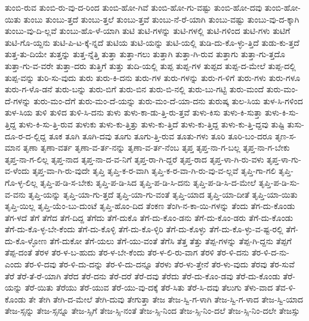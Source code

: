 {ತುಂಬಿ-ರುವ
ತುಂಬಿ-ರು-ವು-ದ-ರಿಂದ
ತುಂಬಿ-ಹೋ-ಗಿವೆ
ತುಂಬಿ-ಹೋ-ಗು-ವಷ್ಟು
ತುಂಬಿ-ಹೋ-ದವು
ತುಂಬಿ-ಹೋ-ಯಿತು
ತುಂಬು
ತುಂಬು-ತ್ತದೆ
ತುಂಬು-ತ್ತಲೆ
ತುಂಬು-ತ್ತವೆ
ತುಂಬು-ನೆ-ರೆ-ಯಾಗಿ
ತುಂಬು-ವಷ್ಟು
ತುಂಬು-ವು-ದ-ಕ್ಕಾಗಿ
ತುಂಬು-ವು-ದಿ-ಲ್ಲವೆ
ತುಂಬು-ಹೊ-ಳೆ-ಯಾಗಿ
ತುಟಿ
ತುಟಿ-ಗಳನ್ನು
ತುಟಿ-ಗಳಲ್ಲಿ
ತುಟಿ-ಗಳಿಂದ
ತುಟಿ-ಗಳು
ತುಟಿಗೆ
ತುಟಿ-ಗೊ-ಯ್ದನು
ತುಟಿ-ಪಿ-ಟ-ಕ್ಕೆ-ನ್ನದೆ
ತುಟಿಯ
ತುಟಿ-ಯನ್ನು
ತುಟಿ-ಯಲ್ಲಿ
ತುಡಿ-ದು-ಕೊ-ಳ್ಳು-ತ್ತಿದೆ
ತುಡು-ಕು-ತ್ತದೆ
ತುತ್ತ-ತು-ದಿಯೇ
ತುತ್ತನ್ನು
ತುತ್ತ-ನ್ನೆತ್ತಿ
ತುತ್ತಾ
ತುತ್ತಾ-ಗಲು
ತುತ್ತಾಗಿ
ತುತ್ತಾ-ಗಿ-ರುವ
ತುತ್ತಾಗು
ತುತ್ತಾ-ಗು-ತ್ತದೊ
ತುತ್ತಾ-ಗು-ವ-ವರೇ
ತುತ್ತಾ-ದರು
ತುತ್ತಿಗೆ
ತುತ್ತು
ತುದಿ-ಯಲ್ಲಿ
ತುಪ್ಪ
ತುಪ್ಪ-ಗಳ
ತುಪ್ಪದ
ತುಪ್ಪ-ದ-ಮೇಲೆ
ತುಪ್ಪ-ದಲ್ಲಿ
ತುಪ್ಪ-ವನ್ನು
ತುರಿ-ಸು-ವುದು
ತುರು
ತುರು-ಕಿ-ದನು
ತುರು-ಗಳ
ತುರು-ಗಳನ್ನು
ತುರು-ಗ-ಳಿಗೆ
ತುರು-ಗಳು
ತುರು-ಗಳೂ
ತುರು-ಗ-ಳೊ-ಡನೆ
ತುರು-ಬನ್ನು
ತುರು-ಬಿಗೆ
ತುರು-ಬಿನ
ತುರು-ಬಿ-ನಲ್ಲಿ
ತುರು-ಬು-ಗಟ್ಟಿ
ತುರು-ಮಂದೆ
ತುರು-ಮಂ-ದೆ-ಗಳನ್ನು
ತುರು-ಮಂ-ದೆಗೆ
ತುರು-ಮಂ-ದೆ-ಯನ್ನು
ತುರು-ಮಂ-ದೆ-ಯಾ-ದನು
ತುರುಷ್ಕ
ತುಲ-ಸಿಯ
ತುಳ-ಸಿ-ಗಳಿಂದ
ತುಳ-ಸಿಯ
ತುಳಿ
ತುಳಿದ
ತುಳಿ-ಸಿ-ದನು
ತುಳು
ತುಳು-ಕಾ-ಡು-ತ್ತಿ-ರು-ತ್ತವೆ
ತುಳು-ಕಿಸು
ತುಳು-ಕಿ-ಸುತ್ತಾ
ತುಳು-ಕಿ-ಸು-ತ್ತಿದ್ದ
ತುಳು-ಕಿ-ಸು-ತ್ತಿ-ರುವ
ತುಳುಕು
ತುಳು-ಕು-ತ್ತಿತ್ತು
ತುಳು-ಕು-ತ್ತಿದೆ
ತುಳು-ಕು-ತ್ತಿದ್ದ
ತುಳು-ಕು-ತ್ತಿ-ದ್ದವು
ತುಷ್ಟಿ
ತುಸು-ದೂ-ರ-ದ-ಲ್ಲಿದ್ದ
ತೂಕ
ತೂಗಿ
ತೂಗಿ-ದವು
ತೂಗು
ತೂಗು-ತ್ತಿ-ರುವ
ತೂತು-ಗಳು
ತೂರಿ
ತೂರಿ-ಬಂ-ದರೂ
ತೃಣ-ಸ-ಮಾನ
ತೃಣಾ
ತೃಣಾ-ವರ್ತ
ತೃಣಾ-ವ-ರ್ತ-ನನ್ನು
ತೃಣಾ-ವ-ರ್ತ-ನೆಂಬ
ತೃಪ್ತ
ತೃಪ್ತ-ನಾ-ಗ-ಬಲ್ಲ
ತೃಪ್ತ-ನಾ-ಗ-ಬೇಕು
ತೃಪ್ತ-ನಾ-ಗ-ಲಿಲ್ಲ
ತೃಪ್ತ-ನಾದ
ತೃಪ್ತ-ನಾ-ದ-ವ-ನಿಗೆ
ತೃಪ್ತ-ರಾ-ಗಿ-ದ್ದರೆ
ತೃಪ್ತ-ರಾದ
ತೃಪ್ತ-ಳಾ-ಗಿ-ರು-ವಳು
ತೃಪ್ತ-ಳಾ-ಗು-ವ-ಳೆಂದು
ತೃಪ್ತ-ವಾ-ಗಿ-ರು-ವುದೇ
ತೃಪ್ತಿ
ತೃಪ್ತಿ-ಕ-ರ-ವಾಗಿ
ತೃಪ್ತಿ-ಕ-ರ-ವಾ-ಗಿ-ರು-ವು-ವ-ಲ್ಲವೆ
ತೃಪ್ತಿ-ಗಾ-ಗಲಿ
ತೃಪ್ತಿ-ಗೊ-ಳ್ಳ-ಲಿಲ್ಲ
ತೃಪ್ತಿ-ಪ-ಡಿ-ಸ-ಬೇಕು
ತೃಪ್ತಿ-ಪ-ಡಿ-ಸಿದ
ತೃಪ್ತಿ-ಪ-ಡಿ-ಸಿ-ದನು
ತೃಪ್ತಿ-ಪ-ಡಿ-ಸಿ-ದ-ಮೇಲೆ
ತೃಪ್ತಿ-ಪ-ಡಿ-ಸು-ವ-ವನು
ತೃಪ್ತಿ-ಯನ್ನು
ತೃಪ್ತಿ-ಯಾ-ಗು-ತ್ತದೆ
ತೃಪ್ತಿ-ಯಾ-ಗು-ವಂತೆ
ತೃಪ್ತಿ-ಯಾದ
ತೃಪ್ತಿ-ಯಾ-ದೀತೆ
ತೃಪ್ತಿ-ಯಾ-ಯಿತು
ತೃಪ್ತಿ-ಯಿಲ್ಲ
ತೃಪ್ತಿ-ಯೆಂ-ಬು-ದುಂಟೆ
ತೃಪ್ತಿ-ಹೊಂ-ದಿದ
ತೆಂಕಣ
ತೆಂಗಿ-ನ-ಕಾ-ಯಿ-ಗಳನ್ನು
ತೆಂದು
ತೆಗ-ದು-ಕೊಂಡು
ತೆಗ-ಳದೆ
ತೆಗೆ
ತೆಗೆದ
ತೆಗೆ-ದಿದ್ದ
ತೆಗೆದು
ತೆಗೆ-ದುಕೊ
ತೆಗೆ-ದು-ಕೊಂ-ಡನು
ತೆಗೆ-ದು-ಕೊಂ-ಡರು
ತೆಗೆ-ದು-ಕೊಂಡು
ತೆಗೆ-ದು-ಕೊ-ಳ್ಳ-ಬೇ-ಕೆಂದು
ತೆಗೆ-ದು-ಕೊಳ್ಳಿ
ತೆಗೆ-ದು-ಕೊ-ಳ್ಳಿರಿ
ತೆಗೆ-ದು-ಕೊಳ್ಳು
ತೆಗೆ-ದು-ಕೊ-ಳ್ಳು-ವ-ಷ್ಟ-ರಲ್ಲಿ
ತೆಗೆ-ದು-ಕೊ-ಳ್ಳೋಣ
ತೆಗೆ-ದುಕೋ
ತೆಗೆ-ಯಲು
ತೆಗೆ-ಯು-ವಂತೆ
ತೆಗೆಸಿ
ತೆತ್ತ
ತೆತ್ತು
ತೆಪ್ಪ-ಗಳನ್ನು
ತೆಪ್ಪ-ಗಿ-ದ್ದನು
ತೆಪ್ಪಗೆ
ತೆಪ್ಪ-ದಂತೆ
ತೆರಳ
ತೆರ-ಳ-ಬ-ಹುದು
ತೆರ-ಳ-ಬೇ-ಕೆಂದು
ತೆರ-ಳ-ಲಿ-ರು-ವಾಗ
ತೆರಳಿ
ತೆರ-ಳಿ-ದನು
ತೆರ-ಳಿ-ದ-ನು-ಎಂದು
ತೆರ-ಳಿ-ದವು
ತೆರ-ಳಿ-ದು-ದನ್ನು
ತೆರ-ಳಿ-ದು-ದನ್ನೂ
ತೆರಳು
ತೆರ-ಳು-ತ್ತೇನೆ
ತೆರ-ಳು-ವುದು
ತೆರವು
ತೆರ-ಸುವೆ
ತೆರೆ
ತೆರೆ-ತೆ-ರೆ-ಯಾಗಿ
ತೆರೆದ
ತೆರೆ-ದನು
ತೆರೆ-ದರೆ
ತೆರೆ-ದವು
ತೆರೆದು
ತೆರೆ-ದು-ಕೊಂ-ಡವು
ತೆರೆ-ದು-ಕೊಂಡು
ತೆರೆ-ಯನ್ನು
ತೆರೆ-ಯಿತು
ತೆರೆಯು
ತೆರೆ-ಯುವ
ತೆರೆ-ಯು-ವು-ದಕ್ಕೆ
ತೆರೆ-ಸಿತು
ತೆರೆ-ಸಿ-ದವು
ತೆಲುಗು
ತೆಳು-ವಾದ
ತೆವ-ಳಿ-ಕೊಂಡು
ತೇ
ತೇಗಿ
ತೇಗಿ-ದ-ಮೇಲೆ
ತೇಗಿ-ದುವು
ತೇಗುತ್ತಾ
ತೇಜ
ತೇಜ-ಸ್ವಿ-ಗ-ಳಾಗಿ
ತೇಜ-ಸ್ವಿ-ಗ-ಳಾದ
ತೇಜ-ಸ್ವಿ-ಯಾದ
ತೇಜ-ಸ್ಸನ್ನು
ತೇಜ-ಸ್ಸನ್ನೂ
ತೇಜ-ಸ್ಸಿಗೆ
ತೇಜ-ಸ್ಸಿ-ನಂತೆ
ತೇಜ-ಸ್ಸಿ-ನಿಂದ
ತೇಜ-ಸ್ಸಿ-ನಿಂ-ದಲೆ
ತೇಜ-ಸ್ಸಿ-ನಿಂ-ದಲೇ
ತೇಜಸ್ಸು
}
